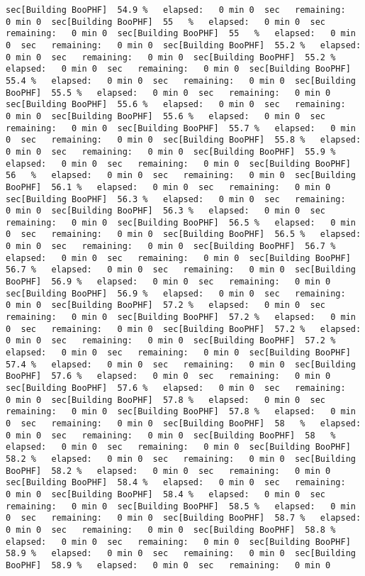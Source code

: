 \documentclass[
]{book}
\begin{document}
\begin{verbatim}
sec[Building BooPHF]  54.9 %   elapsed:   0 min 0  sec   remaining:   0 min 0  sec[Building BooPHF]  55   %   elapsed:   0 min 0  sec   remaining:   0 min 0  sec[Building BooPHF]  55   %   elapsed:   0 min 0  sec   remaining:   0 min 0  sec[Building BooPHF]  55.2 %   elapsed:   0 min 0  sec   remaining:   0 min 0  sec[Building BooPHF]  55.2 %   elapsed:   0 min 0  sec   remaining:   0 min 0  sec[Building BooPHF]  55.4 %   elapsed:   0 min 0  sec   remaining:   0 min 0  sec[Building BooPHF]  55.5 %   elapsed:   0 min 0  sec   remaining:   0 min 0  sec[Building BooPHF]  55.6 %   elapsed:   0 min 0  sec   remaining:   0 min 0  sec[Building BooPHF]  55.6 %   elapsed:   0 min 0  sec   remaining:   0 min 0  sec[Building BooPHF]  55.7 %   elapsed:   0 min 0  sec   remaining:   0 min 0  sec[Building BooPHF]  55.8 %   elapsed:   0 min 0  sec   remaining:   0 min 0  sec[Building BooPHF]  55.9 %   elapsed:   0 min 0  sec   remaining:   0 min 0  sec[Building BooPHF]  56   %   elapsed:   0 min 0  sec   remaining:   0 min 0  sec[Building BooPHF]  56.1 %   elapsed:   0 min 0  sec   remaining:   0 min 0  sec[Building BooPHF]  56.3 %   elapsed:   0 min 0  sec   remaining:   0 min 0  sec[Building BooPHF]  56.3 %   elapsed:   0 min 0  sec   remaining:   0 min 0  sec[Building BooPHF]  56.5 %   elapsed:   0 min 0  sec   remaining:   0 min 0  sec[Building BooPHF]  56.5 %   elapsed:   0 min 0  sec   remaining:   0 min 0  sec[Building BooPHF]  56.7 %   elapsed:   0 min 0  sec   remaining:   0 min 0  sec[Building BooPHF]  56.7 %   elapsed:   0 min 0  sec   remaining:   0 min 0  sec[Building BooPHF]  56.9 %   elapsed:   0 min 0  sec   remaining:   0 min 0  sec[Building BooPHF]  56.9 %   elapsed:   0 min 0  sec   remaining:   0 min 0  sec[Building BooPHF]  57.2 %   elapsed:   0 min 0  sec   remaining:   0 min 0  sec[Building BooPHF]  57.2 %   elapsed:   0 min 0  sec   remaining:   0 min 0  sec[Building BooPHF]  57.2 %   elapsed:   0 min 0  sec   remaining:   0 min 0  sec[Building BooPHF]  57.2 %   elapsed:   0 min 0  sec   remaining:   0 min 0  sec[Building BooPHF]  57.4 %   elapsed:   0 min 0  sec   remaining:   0 min 0  sec[Building BooPHF]  57.6 %   elapsed:   0 min 0  sec   remaining:   0 min 0  sec[Building BooPHF]  57.6 %   elapsed:   0 min 0  sec   remaining:   0 min 0  sec[Building BooPHF]  57.8 %   elapsed:   0 min 0  sec   remaining:   0 min 0  sec[Building BooPHF]  57.8 %   elapsed:   0 min 0  sec   remaining:   0 min 0  sec[Building BooPHF]  58   %   elapsed:   0 min 0  sec   remaining:   0 min 0  sec[Building BooPHF]  58   %   elapsed:   0 min 0  sec   remaining:   0 min 0  sec[Building BooPHF]  58.2 %   elapsed:   0 min 0  sec   remaining:   0 min 0  sec[Building BooPHF]  58.2 %   elapsed:   0 min 0  sec   remaining:   0 min 0  sec[Building BooPHF]  58.4 %   elapsed:   0 min 0  sec   remaining:   0 min 0  sec[Building BooPHF]  58.4 %   elapsed:   0 min 0  sec   remaining:   0 min 0  sec[Building BooPHF]  58.5 %   elapsed:   0 min 0  sec   remaining:   0 min 0  sec[Building BooPHF]  58.7 %   elapsed:   0 min 0  sec   remaining:   0 min 0  sec[Building BooPHF]  58.8 %   elapsed:   0 min 0  sec   remaining:   0 min 0  sec[Building BooPHF]  58.9 %   elapsed:   0 min 0  sec   remaining:   0 min 0  sec[Building BooPHF]  58.9 %   elapsed:   0 min 0  sec   remaining:   0 min 0  
\end{verbatim}
\end{document}
